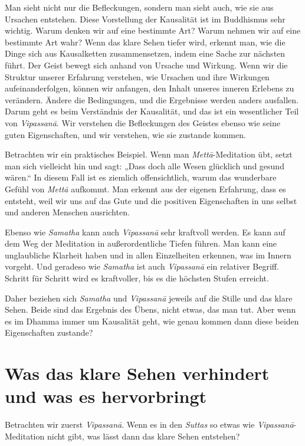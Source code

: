 \documentclass[12pt,openany]{book}
\begin{document}
Man sieht nicht nur die Befleckungen, sondern man sieht auch, wie sie aus Ursachen entstehen. Diese Vorstellung der Kausalität ist im Buddhismus sehr wichtig. Warum denken wir auf eine bestimmte Art? Warum nehmen wir auf eine bestimmte Art wahr? Wenn das klare Sehen tiefer wird, erkennt man, wie die Dinge sich aus Kausalketten zusammensetzen, indem eine Sache zur nächsten führt. Der Geist bewegt sich anhand von Ursache und Wirkung. Wenn wir die Struktur unserer Erfahrung verstehen, wie Ursachen und ihre Wirkungen aufeinanderfolgen, können wir anfangen, den Inhalt unseres inneren Erlebens zu verändern. Ändere die Bedingungen, und die Ergebnisse werden anders ausfallen. Darum geht es beim Verständnis der Kausalität, und das ist ein wesentlicher Teil von \textit{Vipas\-sanā}. Wir verstehen die Befleckungen des Geistes ebenso wie seine guten Eigenschaften, und wir verstehen, wie sie zustande kommen.

Betrachten wir ein praktisches Beispiel. Wenn man \textit{Mettā}-Meditation übt, setzt man sich vielleicht hin und sagt: „Dass doch alle Wesen glücklich und gesund wären.“ In diesem Fall ist es ziemlich offensichtlich, warum das wunderbare Gefühl von \textit{Mettā} aufkommt. Man erkennt aus der eigenen Erfahrung, dass es entsteht, weil wir uns auf das Gute und die positiven Eigenschaften in uns selbst und anderen Menschen ausrichten.

Ebenso wie \textit{Samatha} kann auch \textit{Vipas\-sanā} sehr kraftvoll werden. Es kann auf dem Weg der Meditation in außerordentliche Tiefen führen. Man kann eine unglaubliche Klarheit haben und in allen Einzelheiten erkennen, was im Innern vorgeht. Und geradeso wie \textit{Samatha} ist auch \textit{Vipas\-sanā} ein relativer Begriff. Schritt für Schritt wird es kraftvoller, bis es die höchsten Stufen erreicht.

Daher beziehen sich \textit{Samatha} und \textit{Vipas\-sanā} jeweils auf die Stille und das klare Sehen. Beide sind das Ergebnis des Übens, nicht etwas, das man tut. Aber wenn es im Dhamma immer um Kausalität geht, wie genau kommen dann diese beiden Eigenschaften zustande?

\chapter*{Was das klare Sehen verhindert und was es hervorbringt}

Betrachten wir zuerst \textit{Vipas\-sanā}. Wenn es in den \textit{Suttas} so etwas wie \textit{Vipas\-sanā}-Meditation nicht gibt, was lässt dann das klare Sehen entstehen?
\end{document}
